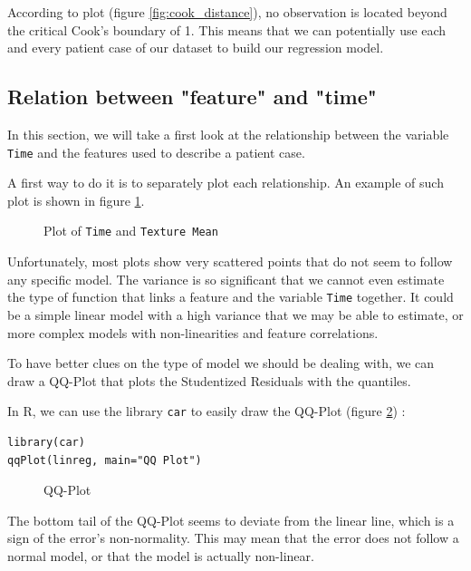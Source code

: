 \documentclass[]{report}
\begin{document}
According to plot (figure \ref{fig:cook_distance}), no observation is located beyond the critical Cook's boundary of 1. This means that we can potentially use each and every patient case of our dataset to build our regression model. 

\subsection{Relation between "feature" and "time"}
In this section, we will take a first look at the relationship between the variable \texttt{Time} and the features used to describe a patient case. 

A first way to do it is to separately plot each relationship. An example of such plot is shown in figure \ref{fig:time_feature_ex1}. 

\begin{figure}[!hb]
	\centering
	
	\caption{Plot of \texttt{Time} and \texttt{Texture Mean} }
	\label{fig:time_feature_ex1}
\end{figure}

Unfortunately, most plots show very scattered points that do not seem to follow any specific model. The variance is so significant that we cannot even estimate the type of function that links a feature and the variable \texttt{Time} together. It could be a simple linear model with a high variance that we may be able to estimate, or more complex models with non-linearities and feature correlations.

To have better clues on the type of model we should be dealing with, we can draw a QQ-Plot that plots the Studentized Residuals with the quantiles. 

In R, we can use the library \texttt{car} to easily draw the QQ-Plot (figure \ref{fig:qq_plot}) :
\begin{lstlisting}
library(car)
qqPlot(linreg, main="QQ Plot")
\end{lstlisting}

\begin{figure}[!hb]
	\centering
	
	\caption{QQ-Plot}
	\label{fig:qq_plot}
\end{figure}

The bottom tail of the QQ-Plot seems to deviate from the linear line, which is a sign of the error's non-normality. This may mean that the error does not follow a normal model, or that the model is actually non-linear.
\end{document}
